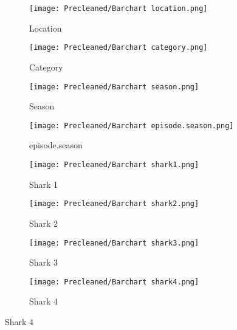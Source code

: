 \documentclass{article}
\begin{document}
\begin{figure}[H]
    \centering
    \begin{subfigure}[b]{0.45\textwidth}
        \texttt{[image: Precleaned/Barchart location.png]} %
        \caption{Location}
        \label{fig:Location}
    \end{subfigure}
    \hfill
    \begin{subfigure}[b]{0.45\textwidth}
        \texttt{[image: Precleaned/Barchart category.png]} %
        \caption{Category}
        \label{fig:Category}
    \end{subfigure}
    
    \begin{subfigure}[b]{0.45\textwidth}
        \texttt{[image: Precleaned/Barchart season.png]} %
        \caption{Season}
        \label{fig:Season}
    \end{subfigure}
    \hfill
    \begin{subfigure}[b]{0.45\textwidth}
        \texttt{[image: Precleaned/Barchart episode.season.png]} %
        \caption{episode.season}
        \label{fig:Episode.season}
    \end{subfigure}

    \begin{subfigure}[b]{0.45\textwidth}
        \texttt{[image: Precleaned/Barchart shark1.png]} %
        \caption{Shark 1}
        \label{fig:shark 1}
    \end{subfigure}
    \hfill
    \begin{subfigure}[b]{0.45\textwidth}
        \texttt{[image: Precleaned/Barchart shark2.png]} %
        \caption{Shark 2}
        \label{fig:shark 2}
    \end{subfigure}

    \begin{subfigure}[b]{0.45\textwidth}
        \texttt{[image: Precleaned/Barchart shark3.png]} %
        \caption{Shark 3}
        \label{fig:shark 3}
    \end{subfigure}
    \hfill
    \begin{subfigure}[b]{0.45\textwidth}
        \texttt{[image: Precleaned/Barchart shark4.png]} %
        \caption{Shark 4}
        \label{fig:shark 4}
    \end{subfigure}


\end{figure}
\end{document}
